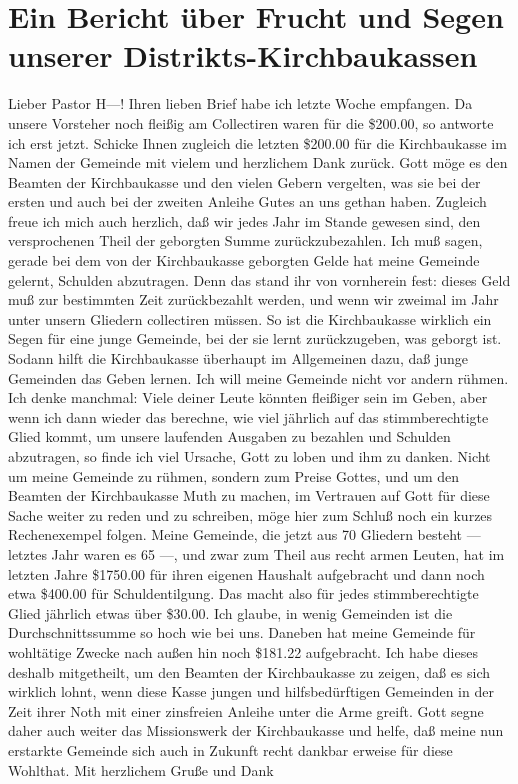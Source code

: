 \chapter[Frucht und Segen der Kirchbaukassen]{Ein Bericht über Frucht und Segen unserer Distrikts-Kirchbaukassen}

Lieber Pastor H—! Ihren lieben Brief habe ich letzte Woche empfangen. Da unsere Vorsteher noch fleißig am Collectiren waren für die \$200.00, so antworte ich erst jetzt. Schicke Ihnen zugleich die letzten \$200.00 für die Kirchbaukasse im Namen der Gemeinde mit vielem und herzlichem Dank zurück. Gott möge es den Beamten der Kirchbaukasse und den vielen Gebern vergelten, was sie bei der ersten und auch bei der zweiten Anleihe Gutes an uns gethan haben. Zugleich freue ich mich auch herzlich, daß wir jedes Jahr im Stande gewesen sind, den versprochenen Theil der geborgten Summe zurückzubezahlen. Ich muß sagen, gerade bei dem von der Kirchbaukasse geborgten Gelde hat meine Gemeinde gelernt, Schulden abzutragen. Denn das stand ihr von vornherein fest: dieses Geld muß zur bestimmten Zeit zurückbezahlt werden, und wenn wir zweimal im Jahr unter unsern Gliedern collectiren müssen. So ist die Kirchbaukasse wirklich ein Segen für eine junge Gemeinde, bei der sie lernt zurückzugeben, was geborgt ist. Sodann hilft die Kirchbaukasse überhaupt im Allgemeinen dazu, daß junge Gemeinden das Geben lernen. Ich will meine Gemeinde nicht vor andern rühmen. Ich denke manchmal: Viele deiner Leute könnten fleißiger sein im Geben, aber wenn ich dann wieder das berechne, wie viel jährlich auf das stimmberechtigte Glied kommt, um unsere laufenden Ausgaben zu bezahlen und Schulden abzutragen, so finde ich viel Ursache, Gott zu loben und ihm zu danken. Nicht um meine Gemeinde zu rühmen, sondern zum Preise Gottes, und um den Beamten der Kirchbaukasse Muth zu machen, im Vertrauen auf Gott für diese Sache weiter zu reden und zu schreiben, möge hier zum Schluß noch ein kurzes Rechenexempel folgen. Meine Gemeinde, die jetzt aus 70 Gliedern besteht — letztes Jahr waren es 65 —, und zwar zum Theil aus recht armen Leuten, hat im letzten Jahre \$1750.00 für ihren eigenen Haushalt aufgebracht und dann noch etwa \$400.00 für Schuldentilgung. Das macht also für jedes stimmberechtigte Glied jährlich etwas über \$30.00. Ich glaube, in wenig Gemeinden ist die Durchschnittssumme so hoch wie bei uns. Daneben hat meine Gemeinde für wohltätige Zwecke nach außen hin noch \$181.22 aufgebracht. Ich habe dieses deshalb mitgetheilt, um den Beamten der Kirchbaukasse zu zeigen, daß es sich wirklich lohnt, wenn diese Kasse jungen und hilfsbedürftigen Gemeinden in der Zeit ihrer Noth mit einer zinsfreien Anleihe unter die Arme greift. Gott segne daher auch weiter das Missionswerk der Kirchbaukasse und helfe, daß meine nun erstarkte Gemeinde sich auch in Zukunft recht dankbar erweise für diese Wohlthat. Mit herzlichem Gruße und Dank

